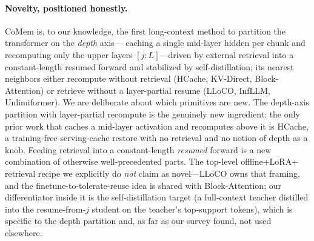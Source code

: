 \paragraph{Novelty, positioned honestly.} CoMem is, to our knowledge, the first
long-context method to partition the transformer on the \emph{depth} axis---%
caching a single mid-layer hidden per chunk and recomputing only the upper layers
$[j{:}L]$---driven by external retrieval into a constant-length resumed forward
and stabilized by self-distillation; its nearest neighbors either recompute
without retrieval (HCache, KV-Direct, Block-Attention) or retrieve without a
layer-partial resume (LLoCO, InfLLM, Unlimiformer). We are deliberate about which
primitives are new. The depth-axis partition with layer-partial recompute is the
genuinely new ingredient: the only prior work that caches a mid-layer activation
and recomputes above it is HCache, a training-free serving-cache restore with no
retrieval and no notion of depth as a knob. Feeding retrieval into a
constant-length \emph{resumed} forward is a new combination of otherwise
well-precedented parts. The top-level offline$+$LoRA$+$retrieval recipe we
explicitly do \emph{not} claim as novel---LLoCO owns that framing, and the
finetune-to-tolerate-reuse idea is shared with Block-Attention; our
differentiator inside it is the self-distillation target (a full-context teacher
distilled into the resume-from-$j$ student on the teacher's top-support tokens),
which is specific to the depth partition and, as far as our survey found, not
used elsewhere.
